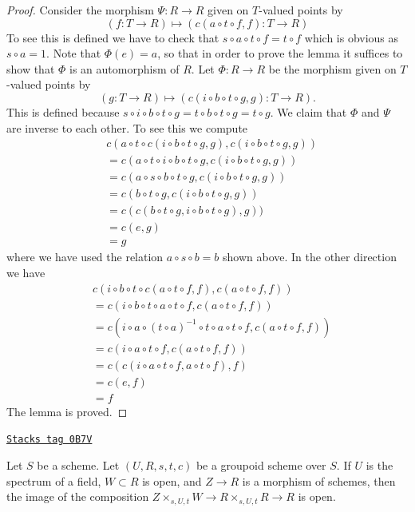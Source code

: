 \begin{proof}
\medskip\noindent
Consider the morphism $\Psi : R \to R$ given on $T$-valued points
by
$$
(f : T \to R) \longmapsto (c(a \circ t \circ f, f) : T \to R)
$$
To see this is defined we have to check that
$s \circ a \circ t \circ f = t \circ f$ which is obvious as $s \circ a = 1$.
Note that $\Phi(e) = a$, so that in order to prove the lemma it
suffices to show that $\Phi$ is an automorphism of $R$.
Let $\Phi : R \to R$ be the morphism given on $T$-valued points by
$$
(g : T \to R) \longmapsto (c(i \circ b \circ t \circ g, g) : T \to R).
$$
This is defined because
$s \circ i \circ b \circ t \circ g = t \circ b \circ t \circ g =
t \circ g$. We claim that $\Phi$ and $\Psi$ are inverse to
each other. To see this we compute
\begin{align*}
& c(a \circ t \circ c(i \circ b \circ t \circ g, g),
c(i \circ b \circ t \circ g, g)) \\
& =
c(a \circ t \circ i \circ b \circ t \circ g,
c(i \circ b \circ t \circ g, g)) \\
& =
c(a \circ s \circ b \circ t \circ g,
c(i \circ b \circ t \circ g, g)) \\
& =
c(b \circ t \circ g, c(i \circ b \circ t \circ g, g)) \\
& =
c(c(b \circ t \circ g, i \circ b \circ t \circ g), g)) \\
& =
c(e, g) \\
& = g
\end{align*}
where we have used the relation $a \circ s \circ b = b$ shown above.
In the other direction we have
\begin{align*}
& c(i \circ b \circ t \circ c(a \circ t \circ f, f), c(a \circ t \circ f, f)) \\
& =
c(i \circ b \circ t \circ a \circ t \circ f, c(a \circ t \circ f, f)) \\
& =
c(i \circ a \circ (t \circ a)^{-1} \circ t \circ a \circ t \circ f,
c(a \circ t \circ f, f)) \\
& =
c(i \circ a \circ t \circ f, c(a \circ t \circ f, f)) \\
& =
c(c(i \circ a \circ t \circ f, a \circ t \circ f), f) \\
& =
c(e, f) \\
& = f
\end{align*}
The lemma is proved.
\end{proof}

\begin{lemma}
\label{more-groupoids-lemma-groupoid-on-field-translate-open}
\href{https://stacks.math.columbia.edu/tag/0B7V}{\texttt{Stacks tag 0B7V}}

Let $S$ be a scheme. Let $(U, R, s, t, c)$ be a groupoid scheme
over $S$. If $U$ is the spectrum of a field, $W \subset R$ is open,
and $Z \to R$ is a morphism of schemes, then the image of the
composition $Z \times_{s, U, t} W \to R \times_{s, U, t} R \to R$ is open.
\end{lemma}

